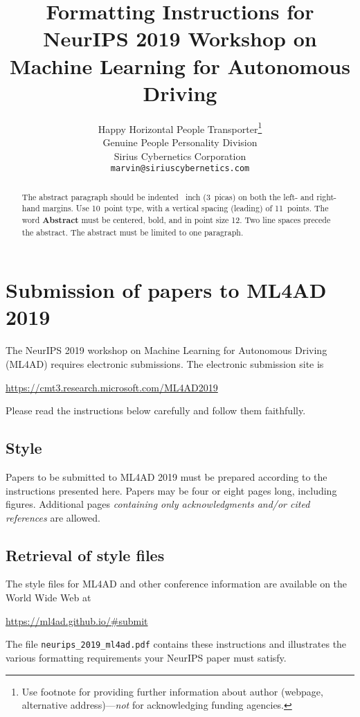 \documentclass{article}
\title{Formatting Instructions for NeurIPS 2019 Workshop on Machine Learning for Autonomous Driving}
\author{%
  Happy Horizontal People Transporter\thanks{Use footnote for providing further information
  about author (webpage, alternative address)---\emph{not} for acknowledging funding agencies.} \\
  Genuine People Personality Division\\
  Sirius Cybernetics Corporation\\
  \texttt{marvin@siriuscybernetics.com} \\
}
\begin{document}
\maketitle

\begin{abstract}
  The abstract paragraph should be indented ~inch (3~picas) on
  both the left- and right-hand margins. Use 10~point type, with a vertical
  spacing (leading) of 11~points.  The word \textbf{Abstract} must be centered,
  bold, and in point size 12. Two line spaces precede the abstract. The abstract
  must be limited to one paragraph.
\end{abstract}

\section{Submission of papers to ML4AD 2019}

The NeurIPS 2019 workshop on Machine Learning for Autonomous Driving (ML4AD)
requires electronic submissions.  The electronic submission site is
\begin{center}
  \url{https://cmt3.research.microsoft.com/ML4AD2019}
\end{center}

Please read the instructions below carefully and follow them faithfully.

\subsection{Style}

Papers to be submitted to ML4AD 2019 must be prepared according to the
instructions presented here. Papers may be four or eight pages long,
including figures. Additional pages \emph{containing only acknowledgments and/or
  cited references} are allowed.

\subsection{Retrieval of style files}

The style files for ML4AD and other conference information are available on
the World Wide Web at
\begin{center}
  \url{https://ml4ad.github.io/#submit}
\end{center}
The file \verb+neurips_2019_ml4ad.pdf+ contains these instructions and illustrates the
various formatting requirements your NeurIPS paper must satisfy.
\end{document}
